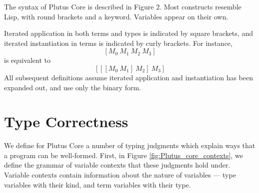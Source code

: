 \documentclass[conference]{IEEEtran}
\newcommand{\inst}[2]{\texttt{\{}#1 ~ #2\texttt{\}}}
\newcommand{\app}[2]{\texttt{[} #1 ~ #2 \texttt{]}}
\newcommand{\appT}[2]{\texttt{[} #1 ~ #2 \texttt{]}}
\begin{document}
The syntax of Plutus Core is described in Figure 2. Most constructs
resemble Lisp, with round brackets and a keyword. Variables appear on
their own.

Iterated application in both terms and types is indicated by square
brackets, and iterated instantiation in terms is indicated by curly brackets.
For instance,
\[
  [M_0 ~ M_1 ~ M_2 ~ M_3]
\] 
is equivalent to 
\[
  [[[M_0 ~ M_1] ~ M_2] ~ M_3]
\]
All subsequent definitions assume iterated application and instantiation
has been expanded out, and use only the binary form.
















%








\section{Type Correctness}

We define for Plutus Core a number of typing judgments which explain ways that a program can be well-formed. First, in Figure \ref{fig:Plutus_core_contexts}, we define the grammar of variable contexts that these judgments hold under. Variable contexts contain information about the nature of variables --- type variables with their kind, and term variables with their type.
\end{document}
